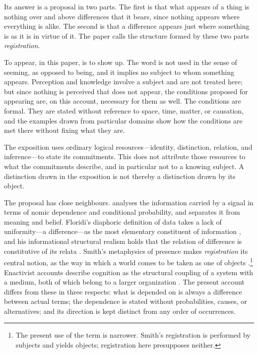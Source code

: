 \documentclass[11pt,a4paper,oneside]{scrartcl}
\begin{document}
Its answer is a proposal in two parts. The first is that what appears of a thing is nothing over
and above differences that it bears, since nothing appears where everything is alike. The second is
that a difference appears just where something is as it is in virtue of it. The paper calls the
structure formed by these two parts \emph{registration}.

To appear, in this paper, is to show up. The word is not used in the sense of seeming, as opposed
to being, and it implies no subject to whom something appears. Perception and knowledge involve a
subject and are not treated here; but since nothing is perceived that does not appear, the
conditions proposed for appearing are, on this account, necessary for them as well. The
conditions are formal. They are stated without reference to space, time, matter, or causation, and
the examples drawn from particular domains show how the conditions are met there without fixing
what they are.

The exposition uses ordinary logical resources---identity, distinction, relation, and
inference---to state its commitments. This does not attribute those resources to what the
commitments describe, and in particular not to a knowing subject. A distinction drawn in the
exposition is not thereby a distinction drawn by its object.

The proposal has close neighbours. \textcite{dretske1981} analyses the information carried by a
signal in terms of nomic dependence and conditional probability, and separates it from meaning and
belief. Floridi's diaphoric definition of data takes a lack of uniformity---a difference---as the
most elementary constituent of information \autocite{floridi2011}, and his informational structural
realism holds that the relation of difference is constitutive of its relata \autocite{floridi2008}.
Smith's metaphysics of presence makes \emph{registration} its central notion, as the way in which a
world comes to be taken as one of objects \autocite{smith1996}.\footnote{The present use of the term
is narrower. Smith's registration is performed by subjects and yields objects; registration here
presupposes neither.} Enactivist accounts describe cognition as the structural coupling of a system
with a medium, both of which belong to a larger organization \autocite{maturana1987,thompson2007}.
The present account differs from these in three respects: what is depended on is always a
difference between actual terms; the dependence is stated without probabilities, causes, or
alternatives; and its direction is kept distinct from any order of occurrences.
\end{document}
